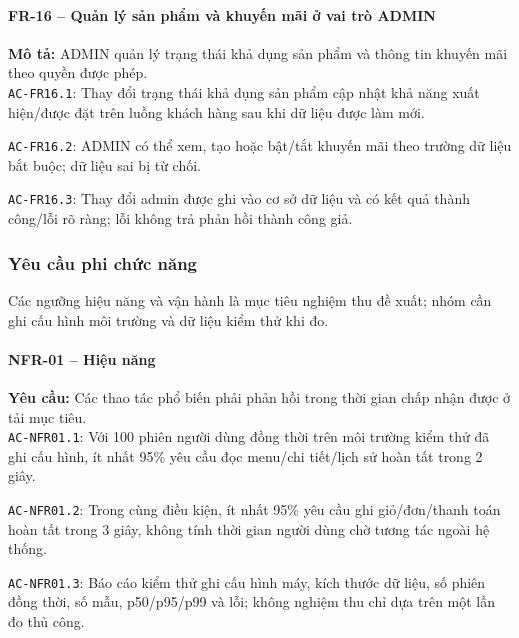 \paragraph{FR-16 -- Quản lý sản phẩm và khuyến mãi ở vai trò ADMIN}
\textbf{Mô tả:} ADMIN quản lý trạng thái khả dụng sản phẩm và thông tin khuyến mãi theo quyền được phép.\\
\noindent\texttt{AC-FR16.1}: Thay đổi trạng thái khả dụng sản phẩm cập nhật khả năng xuất hiện/được đặt trên luồng khách hàng sau khi dữ liệu được làm mới.\par
\noindent\texttt{AC-FR16.2}: ADMIN có thể xem, tạo hoặc bật/tắt khuyến mãi theo trường dữ liệu bắt buộc; dữ liệu sai bị từ chối.\par
\noindent\texttt{AC-FR16.3}: Thay đổi admin được ghi vào cơ sở dữ liệu và có kết quả thành công/lỗi rõ ràng; lỗi không trả phản hồi thành công giả.\par

\subsubsection{Yêu cầu phi chức năng}
Các ngưỡng hiệu năng và vận hành là mục tiêu nghiệm thu đề xuất; nhóm cần ghi cấu hình môi trường và dữ liệu kiểm thử khi đo.
\paragraph{NFR-01 -- Hiệu năng}
\textbf{Yêu cầu:} Các thao tác phổ biến phải phản hồi trong thời gian chấp nhận được ở tải mục tiêu.\\
\noindent\texttt{AC-NFR01.1}: Với 100 phiên người dùng đồng thời trên môi trường kiểm thử đã ghi cấu hình, ít nhất 95\% yêu cầu đọc menu/chi tiết/lịch sử hoàn tất trong 2 giây.\par
\noindent\texttt{AC-NFR01.2}: Trong cùng điều kiện, ít nhất 95\% yêu cầu ghi giỏ/đơn/thanh toán hoàn tất trong 3 giây, không tính thời gian người dùng chờ tương tác ngoài hệ thống.\par
\noindent\texttt{AC-NFR01.3}: Báo cáo kiểm thử ghi cấu hình máy, kích thước dữ liệu, số phiên đồng thời, số mẫu, p50/p95/p99 và lỗi; không nghiệm thu chỉ dựa trên một lần đo thủ công.\par

